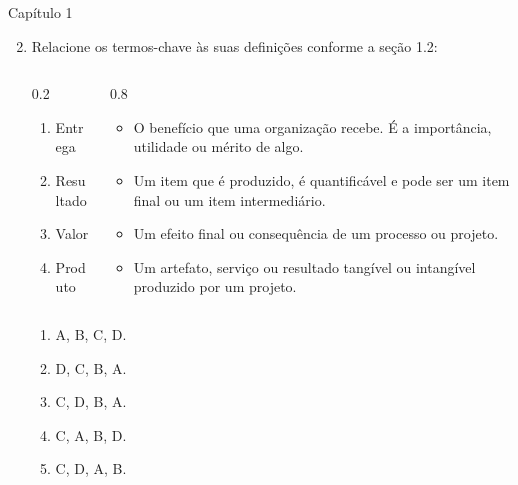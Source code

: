 \documentclass{beamer}
\begin{document}
\begin{frame}{Capítulo 1}
	\begin{enumerate}
		\setcounter{enumi}{1}
		\justifying
		\item Relacione os termos-chave às suas definições conforme a seção 1.2:
			\begin{columns}
				\begin{column}{0.2\textwidth}
					\begin{enumerate}[A]
						\item Entrega
						\item Resultado
						\item Valor
						\item Produto
					\end{enumerate}
				\end{column}
				
				\begin{column}{0.8\textwidth}
					\begin{itemize}
						\justifying
						\item O benefício que uma organização recebe. É a importância, utilidade ou mérito de algo.
						\item Um item que é produzido, é quantificável e pode ser um item final ou um item intermediário.
						\item Um efeito final ou consequência de um processo ou projeto.
						\item Um artefato, serviço ou resultado tangível ou intangível produzido por um projeto.
					\end{itemize}
				\end{column}
			\end{columns}
			\begin{enumerate}[a]
				\item A, B, C, D.
				\item D, C, B, A.
				\item \alert<2>{C, D, B, A}.
				\item C, A, B, D.
				\item C, D, A, B.
			\end{enumerate}
	\end{enumerate}
\end{frame}
\end{document}
